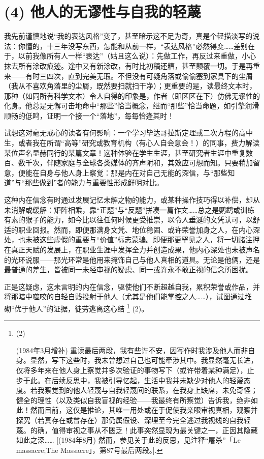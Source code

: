 \section{(4) 他人的无谬性与自我的轻蔑}

我先前谨慎地说“我的表达风格”变了，甚至暗示这不足为奇，真是个轻描淡写的说法：你懂的，十三年没写东西，怎能和从前一样，“表达风格”必然得变……差别在于，以前我像所有人一样“表达”（姑且这么说）：先做工作，再反过来重做，小心抹去所有涂改痕迹。途中又有新涂改，有时比初稿还糟，甚至颠覆一切。于是再重来——有时三四次，直到完美无瑕。不但没有可疑角落或偷偷塞到家具下的尘屑（我从不喜欢角落里的尘屑，既然要扫就扫干净）；更重要的是，读最终文本时，那种（如同所有科学文本）令人自得的印象是，作者（即区区在下）仿佛无谬性的化身。他总是无懈可击地命中“那些”恰当概念，继而“那些”恰当命题，如引擎润滑顺畅的低鸣，证明一个接一个“落地”，每每恰逢其时！

试想这对毫无戒心的读者有何影响：一个学习毕达哥拉斯定理或二次方程的高中生，或者我在所谓“高等”研究或教育机构（有心人自会意会！）的同事，费力解读某位声名显赫同行的某篇文章！这种体验在学生生涯，甚至研究者生涯中重复数百、数千次，伴随家庭与全球各类媒体的齐声附和，其效应可想而知。只要稍加留意，便能在自身与他人身上察觉：那是内在对自己无能的深信，与“那些知道”与“那些做到”者的能力与重要性形成鲜明对比。

这种内在信念有时通过发展记忆未解之物的能力，或某种操作技巧得以补偿，却从未消解或缓解：矩阵相乘，靠“正题”与“反题”拼凑一篇作文……总之是鹦鹉或训练有素的猴子的能力，如今比以往任何时候更受推崇，以令人垂涎的文凭认可，以舒适的职业回报。然而，即便那满身文凭、地位稳固、或许荣誉加身之人，在内心深处，也未被这些虚假的重要与“价值”标志蒙骗。即便那更罕见之人，将一切赌注押在真正天赋的发展上，在职业生涯中发挥全力并创造成果，他内心深处也未被声名的光环说服——那光环常是他用来掩饰自己与他人真相的道具。无论是他俩，还是最普通的差生，皆被同一未经审视的疑虑、同一或许永不敢正视的信念所困扰。

正是这疑虑，这未言明的内在信念，驱使他们不断超越自我，累积荣誉或作品，并将那暗中噬咬的自轻自贱投射于他人（尤其是他们能掌控之人……），试图通过堆砌“优于他人”的证据，徒劳逃离这心结 \footnote{(2)\par (1984年3月增补) 重读最后两段，我有些许不安，因写作时我涉及他人而非自身。显然，写下这些时，我未曾想过自己也可能牵涉其中。我显然毫无长进，仅将多年来在他人身上察觉并多次验证的事物写下（或许带着某种满足），止步于此。在后续反思中，我被引导忆起，生活中我并未缺少对他人的轻蔑态度。若我察觉到的他人轻蔑与自我轻蔑间的联系，在我身上缺席，未免奇怪；健全的理性（以及类似自我盲视的经验——我最终有所察觉）告诉我，绝非如此！然而目前，这仅是推论，其唯一用处或在于促使我亲眼审视真相，观察并探究（若真存在或曾存在）那仍属假设、深埋至今完全逃过我视线的自我轻蔑。的确，值得审视之事从不匮乏！此事突然显现为最关键之一，正因其隐藏如此之深…… [(1984年8月) 然而，参见关于此的反思，见注释“屠杀”「Le massacre;The Massacre」，第87号最后两段。].} (2)。